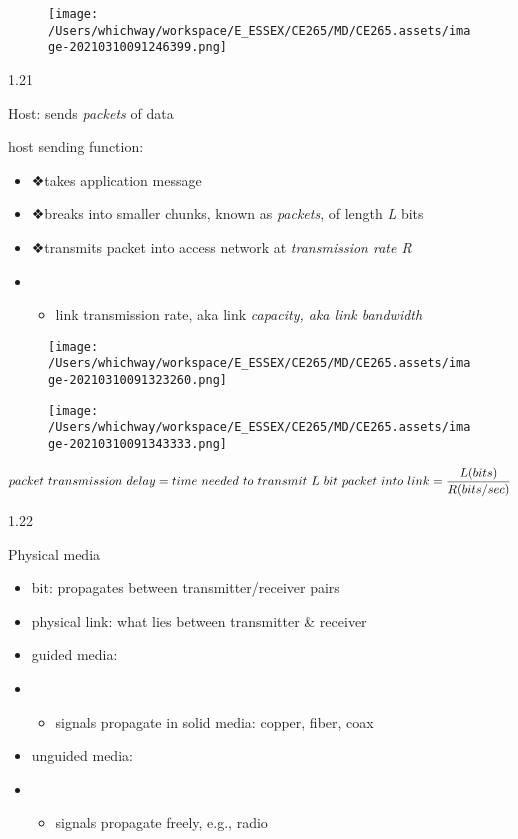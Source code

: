 \documentclass[
]{article}
\begin{document}
\begin{figure}
\centering
\texttt{[image: /Users/whichway/workspace/E\_ESSEX/CE265/MD/CE265.assets/image-20210310091246399.png]}
\caption{}
\end{figure}

1.21

Host: sends \emph{packets} of data

host sending function:

\begin{itemize}
\item
  ❖takes application message
\item
  ❖breaks into smaller chunks, known as \emph{packets}, of length
  \emph{L} bits
\item
  ❖transmits packet into access network at \emph{transmission rate R}
\item
  \begin{itemize}
  \item
    link transmission rate, aka link \emph{capacity, aka link bandwidth}
  \end{itemize}
\end{itemize}

\begin{figure}
\centering
\texttt{[image: /Users/whichway/workspace/E\_ESSEX/CE265/MD/CE265.assets/image-20210310091323260.png]}
\caption{}
\end{figure}

\begin{figure}
\centering
\texttt{[image: /Users/whichway/workspace/E\_ESSEX/CE265/MD/CE265.assets/image-20210310091343333.png]}
\caption{}
\end{figure}

\[packet
\ transmission\ delay
\\ = time\ needed\ to\
transmit\ L\ bit\
packet\ into\ link 
\\ = \frac{L(bits)}{R(bits/sec)}\]

1.22

Physical media

\begin{itemize}
\item
  bit: propagates between transmitter/receiver pairs
\item
  physical link: what lies between transmitter \& receiver
\item
  guided media:
\item
  \begin{itemize}
  \item
    signals propagate in solid media: copper, fiber, coax
  \end{itemize}
\item
  unguided media:
\item
  \begin{itemize}
  \item
    signals propagate freely, e.g., radio
  \end{itemize}
\end{itemize}
\end{document}

